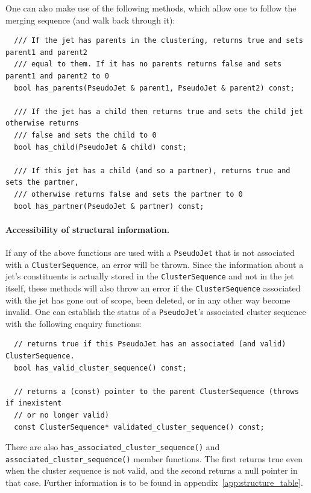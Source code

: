 \documentclass[12pt,a4]{article}
\newcommand{\ttt}[1]{{\small\texttt{#1}}}
\newcommand{\PseudoJet}{\ttt{PseudoJet}\xspace}
\newcommand{\ClusterSequence}{\ttt{ClusterSequence}\xspace}
\newcommand{\CS}{\ttt{ClusterSequence}\xspace}
\begin{document}
One can also make use of the following methods, which allow one to
follow the merging sequence (and walk back through it):
\begin{lstlisting}
  /// If the jet has parents in the clustering, returns true and sets parent1 and parent2 
  /// equal to them. If it has no parents returns false and sets parent1 and parent2 to 0
  bool has_parents(PseudoJet & parent1, PseudoJet & parent2) const;

  /// If the jet has a child then returns true and sets the child jet otherwise returns 
  /// false and sets the child to 0
  bool has_child(PseudoJet & child) const;

  /// If this jet has a child (and so a partner), returns true and sets the partner, 
  /// otherwise returns false and sets the partner to 0
  bool has_partner(PseudoJet & partner) const;
\end{lstlisting}

\paragraph{Accessibility of structural information.}
If any of the above functions are used with a \PseudoJet that is not
associated with a \ClusterSequence, an error will be thrown. 
%
Since the information about a jet's constituents is actually stored in
the \CS and not in the jet itself, these methods will also throw an
error if the \CS associated with the jet has gone out of scope, been
deleted, or in any other way become invalid.
%
One can establish the status of a \PseudoJet's associated cluster
sequence with the following enquiry functions:
\begin{lstlisting}
  // returns true if this PseudoJet has an associated (and valid) ClusterSequence.
  bool has_valid_cluster_sequence() const;

  // returns a (const) pointer to the parent ClusterSequence (throws if inexistent 
  // or no longer valid) 
  const ClusterSequence* validated_cluster_sequence() const; 
\end{lstlisting}
There are also \ttt{has\_associated\_cluster\_sequence()} and
\ttt{associated\_cluster\_sequence()} member functions. The first
returns true even when the cluster sequence is not valid, and the
second returns a null pointer in that case.
%
Further information is to be found in
appendix~\ref{app:structure_table}.
\end{document}
